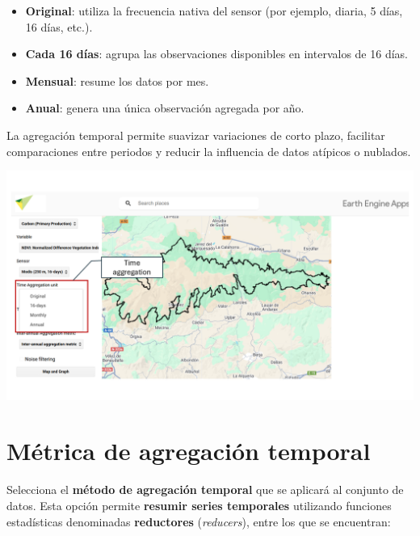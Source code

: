\documentclass[
]{book}
\begin{document}
\begin{itemize}
\item
  \textbf{Original}: utiliza la frecuencia nativa del sensor (por ejemplo, diaria, 5 días, 16 días, etc.).
\item
  \textbf{Cada 16 días}: agrupa las observaciones disponibles en intervalos de 16 días.
\item
  \textbf{Mensual}: resume los datos por mes.
\item
  \textbf{Anual}: genera una única observación agregada por año.
\end{itemize}

La agregación temporal permite suavizar variaciones de corto plazo, facilitar comparaciones entre periodos y reducir la influencia de datos atípicos o nublados.

\includegraphics{assets/aggregation.png}

\chapter{Métrica de agregación temporal}\label{agregacion-temporal}

Selecciona el \textbf{método de agregación temporal} que se aplicará al conjunto de datos. Esta opción permite \textbf{resumir series temporales} utilizando funciones estadísticas denominadas \textbf{reductores} (\emph{reducers}), entre los que se encuentran:
\end{document}
